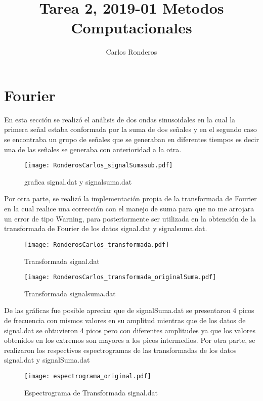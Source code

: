 \documentclass[12pt]{article}
\author{Carlos Ronderos}
\title{Tarea 2, 2019-01 Metodos Computacionales}
\begin{document}
\maketitle

\section{Fourier}

En esta sección se realizó el análisis de dos ondas sinusoidales en la cual la primera señal estaba conformada por la suma de dos señales y en el segundo caso se encontraba un grupo de señales que se generaban en diferentes tiempos es decir una de las señales se generaba con anterioridad a la otra.

\begin{figure}[h!]
\centering
\texttt{[image: RonderosCarlos\_signalSumasub.pdf]}
\caption{grafica signal.dat y signalsuma.dat}
\label{Fig.}
\end{figure}

Por otra parte, se realizó la implementación propia de la transformada de Fourier en la cual realice una corrección con el manejo de suma para que no me arrojara un error de tipo Warning, para posteriormente ser utilizada en la obtención de la transformada de Fourier de los datos signal.dat y signalsuma.dat.

\begin{figure}[h!]
\centering
\texttt{[image: RonderosCarlos\_transformada.pdf]}
\caption{Transformada signal.dat }
\label{Fig.}
\end{figure}

\begin{figure}[h!]
\centering
\texttt{[image: RonderosCarlos\_transformada\_originalSuma.pdf]}
\caption{Transformada signalsuma.dat }
\label{Fig.}
\end{figure}

De las gráficas fue posible apreciar que de signalSuma.dat se presentaron 4 picos de frecuencia con mismos valores en su amplitud mientras  que de los datos de signal.dat se obtuvieron 4 picos pero con diferentes amplitudes ya que los valores obtenidos en los extremos son mayores a los picos intermedios.
Por otra parte, se realizaron los respectivos espectrogramas de las transformadas de los datos signal.dat y signalSuma.dat

\begin{figure}[h!]
\centering
\texttt{[image: espectrograma\_original.pdf]}
\caption{Espectrograma de Transformada signal.dat }
\label{Fig.}
\end{figure}
\end{document}

